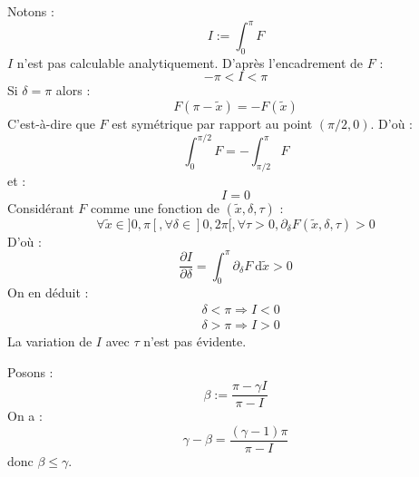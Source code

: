 \documentclass[a4paper,english,french]{article}
\newcommand{\ud}{\mathrm{d}}
\begin{document}
Notons :
\begin{equation*}
  I := \int_0 ^\pi F
\end{equation*}
$I$ n'est pas calculable analytiquement. D'après l'encadrement de $F$
:
\begin{equation*}
  - \pi < I < \pi
\end{equation*}
Si $\delta = \pi$ alors :
\begin{equation*}
  F(\pi - \tilde x) = - F(\tilde x)
\end{equation*}
C'est-à-dire que $F$ est symétrique par rapport au point $(\pi / 2,
0)$. D'où :
\begin{equation*}
  \int_0 ^{\pi / 2} F = - \int_{\pi / 2} ^\pi F
\end{equation*}
et :
\begin{equation*}
  I = 0
\end{equation*}
Considérant $F$ comme une fonction de $(\tilde x, \delta, \tau)$ :
\begin{equation*}
  \forall \tilde x \in ]0, \pi[, \forall \delta \in ]0, 2 \pi[,
  \forall \tau > 0,
  \partial_\delta F(\tilde x, \delta, \tau) > 0
\end{equation*}
D'où :
\begin{equation*}
  \frac{\partial I}{\partial \delta}
  = \int_0 ^\pi \partial_\delta F\ \ud \tilde x > 0
\end{equation*}
On en déduit :
\begin{align*}
  & \delta < \pi \Rightarrow I < 0 \\
  & \delta > \pi \Rightarrow I > 0
\end{align*}
La variation de $I$ avec $\tau$ n'est pas évidente.

Posons :
\begin{equation*}
  \beta := \frac{\pi - \gamma I}{\pi - I}
\end{equation*}
On a :
\begin{equation*}
  \gamma - \beta = \frac{(\gamma - 1) \pi}{\pi - I}
\end{equation*}
donc $\beta \le \gamma$.
\end{document}
